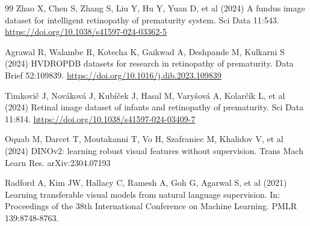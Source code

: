 \documentclass[pdflatex,sn-vancouver,Numbered,iicol]{sn-jnl}
\begin{document}
\begin{thebibliography}{99}
Zhao X, Chen S, Zhang S, Liu Y, Hu Y, Yuan D, et al (2024) A fundus image
dataset for intelligent retinopathy of prematurity system. Sci Data 11:543.
\url{https://doi.org/10.1038/s41597-024-03362-5}

Agrawal R, Walambe R, Kotecha K, Gaikwad A, Deshpande M, Kulkarni S (2024)
HVDROPDB datasets for research in retinopathy of prematurity. Data Brief
52:109839. \url{https://doi.org/10.1016/j.dib.2023.109839}

Timkovi{\v{c}} J, Nov{\'a}kov{\'a} J, Kub{\'i}{\v{c}}ek J, Hasal M,
Vary{\v{s}}ov{\'a} A, Kolar{\v{c}}{\'i}k L, et al (2024) Retinal image dataset of
infants and retinopathy of prematurity. Sci Data 11:814.
\url{https://doi.org/10.1038/s41597-024-03409-7}

Oquab M, Darcet T, Moutakanni T, Vo H, Szafraniec M, Khalidov V, et al (2024)
DINOv2: learning robust visual features without supervision. Trans Mach Learn
Res. arXiv:2304.07193

Radford A, Kim JW, Hallacy C, Ramesh A, Goh G, Agarwal S, et al (2021)
Learning transferable visual models from natural language supervision. In:
Proceedings of the 38th International Conference on Machine Learning. PMLR
139:8748-8763.

\end{thebibliography}
\end{document}
